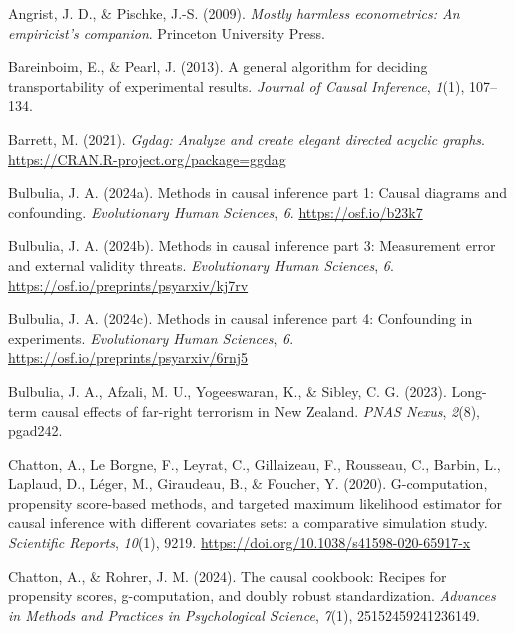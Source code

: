 \documentclass[
  single column]{article}
\newlength{\cslhangindent}
\newenvironment{CSLReferences}[2] %
 {\begin{list}{}{%
  \setlength{\itemindent}{0pt}
  \setlength{\leftmargin}{0pt}
  \setlength{\parsep}{0pt}
  \ifodd #1
   \setlength{\leftmargin}{\cslhangindent}
   \setlength{\itemindent}{-1\cslhangindent}
  \fi
  \setlength{\itemsep}{#2\baselineskip}}}
 {\end{list}}
\begin{document}
\label{refs}
\begin{CSLReferences}{1}{0}
Angrist, J. D., \& Pischke, J.-S. (2009). \emph{Mostly harmless
econometrics: An empiricist's companion}. Princeton University Press.

Bareinboim, E., \& Pearl, J. (2013). A general algorithm for deciding
transportability of experimental results. \emph{Journal of Causal
Inference}, \emph{1}(1), 107--134.

Barrett, M. (2021). \emph{Ggdag: Analyze and create elegant directed
acyclic graphs}. \url{https://CRAN.R-project.org/package=ggdag}

Bulbulia, J. A. (2024a). Methods in causal inference part 1: Causal
diagrams and confounding. \emph{Evolutionary Human Sciences}, \emph{6}.
\url{https://osf.io/b23k7}

Bulbulia, J. A. (2024b). Methods in causal inference part 3: Measurement
error and external validity threats. \emph{Evolutionary Human Sciences},
\emph{6}. \url{https://osf.io/preprints/psyarxiv/kj7rv}

Bulbulia, J. A. (2024c). Methods in causal inference part 4: Confounding
in experiments. \emph{Evolutionary Human Sciences}, \emph{6}.
\url{https://osf.io/preprints/psyarxiv/6rnj5}

Bulbulia, J. A., Afzali, M. U., Yogeeswaran, K., \& Sibley, C. G.
(2023). Long-term causal effects of far-right terrorism in {N}ew
{Z}ealand. \emph{PNAS Nexus}, \emph{2}(8), pgad242.

Chatton, A., Le Borgne, F., Leyrat, C., Gillaizeau, F., Rousseau, C.,
Barbin, L., Laplaud, D., Léger, M., Giraudeau, B., \& Foucher, Y.
(2020). G-computation, propensity score-based methods, and targeted
maximum likelihood estimator for causal inference with different
covariates sets: a comparative simulation study. \emph{Scientific
Reports}, \emph{10}(1), 9219.
\url{https://doi.org/10.1038/s41598-020-65917-x}

Chatton, A., \& Rohrer, J. M. (2024). The causal cookbook: Recipes for
propensity scores, g-computation, and doubly robust standardization.
\emph{Advances in Methods and Practices in Psychological Science},
\emph{7}(1), 25152459241236149.


\end{CSLReferences}
\end{document}
